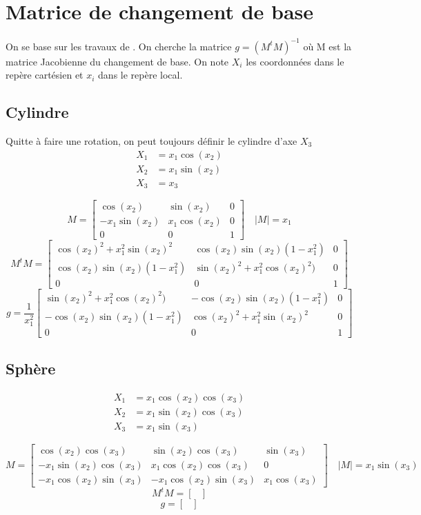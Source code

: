 \section{Matrice de changement de base}
On se base sur les travaux de \cite{lafitte_diffraction_1998}. On cherche la matrice $g=\left(M^tM\right)^{-1}$ où M est la matrice Jacobienne du changement de base.
On note $X_i$ les coordonnées dans le repère cartésien et $x_i$ dans le repère local.


\subsection{Cylindre}
Quitte à faire une rotation, on peut toujours définir le cylindre d'axe $X_3$
\begin{align*}
X_1 &= x_1 \cos(x_2) \\
X_2 &= x_1 \sin(x_2) \\
X_3 &= x_3
\end{align*}

\[
M = \begin{bmatrix}
\cos(x_2) & \sin(x_2) & 0 \\
-x_1\sin(x_2) & x_1\cos(x_2) & 0 \\
0 & 0 & 1
\end{bmatrix} \quad |M| = x_1
\]
\[
M^tM =
\begin{bmatrix}
\cos(x_2)^2 + x_1^2 \sin(x_2)^2 & \cos(x_2)\sin(x_2)(1-x_1^2) & 0 \\
\cos(x_2)\sin(x_2)(1-x_1^2) & \sin(x_2)^2 + x_1^2\cos(x_2)^2) & 0 \\
0 & 0 & 1
\end{bmatrix}
\]
\[
g = \frac{1}{x_1^2}
\begin{bmatrix}
\sin(x_2)^2 + x_1^2\cos(x_2)^2) & -\cos(x_2)\sin(x_2)(1-x_1^2) & 0 \\
-\cos(x_2)\sin(x_2)(1-x_1^2) & \cos(x_2)^2 + x_1^2 \sin(x_2)^2& 0 \\
0 & 0 & 1
\end{bmatrix}
\]
\subsection{Sphère}
\begin{align*}
X_1 &= x_1 \cos(x_2)\cos(x_3) \\
X_2 &= x_1 \sin(x_2)\cos(x_3) \\
X_3 &= x_1 \sin(x_3)
\end{align*}

\[
M = \begin{bmatrix}
\cos(x_2)\cos(x_3) & \sin(x_2)\cos(x_3) & \sin(x_3) \\
-x_1\sin(x_2)\cos(x_3) & x_1\cos(x_2)\cos(x_3) & 0 \\
-x_1 \cos(x_2)\sin(x_3) & -x_1 \cos(x_2)\sin(x_3) & x_1\cos(x_3)
\end{bmatrix} \quad |M| = x_1 \sin(x_3)
\]
\[
M^tM =
\begin{bmatrix}

\end{bmatrix}
\]
\[
g =
\begin{bmatrix}

\end{bmatrix}
\]